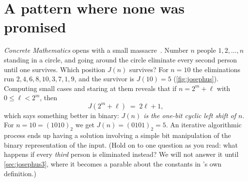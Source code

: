 \section{A pattern where none was promised}\label{sec:josephus}
\makeatletter\edef\josephussectionhref{\@currentHref}\makeatother

\emph{Concrete Mathematics} opens with a small massacre~\citep[\S 1.1]{GKP1994}.
Number $n$ people $1,2,\dots,n$ standing in a circle, and going around the
circle eliminate every second person until one survives. Which position
$J(n)$ survives? For $n=10$ the eliminations run
$2,4,6,8,10,3,7,1,9$, and the survivor is $J(10)=5$
(\cref{fig:josephus}). Computing small cases and staring at them reveals
that if $n = 2^m + \ell$ with $0 \le \ell < 2^m$, then
\begin{equation}\label{eq:josephus}
  J(2^m + \ell) \;=\; 2\ell + 1 ,
\end{equation}
which says something better in binary: \emph{$J(n)$ is the one-bit
cyclic left shift of $n$}. For $n = 10 = (1010)_2$ we get $J(n) =
(0101)_2 = 5$. An iterative algorithmic process ends up having a
solution involving a simple bit manipulation of the binary
representation of the input. (Hold on to one question as you read: what
happens if every \emph{third} person is eliminated instead? We will not
answer it until \cref{sec:josephus3}, where it becomes a parable about
the constants in \SHA{}'s own definition.)


